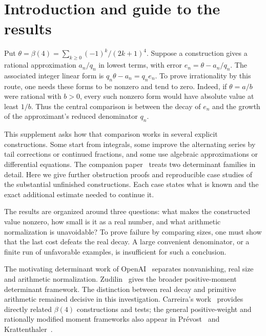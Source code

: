 \section{Introduction and guide to the results}
Put $\theta=\beta(4)=\sum_{k\geq0}(-1)^k/(2k+1)^4$.
Suppose a construction gives a rational approximation $a_n/q_n$ in
lowest terms, with error $e_n=\theta-a_n/q_n$. The associated integer
linear form is $q_n\theta-a_n=q_ne_n$. To prove irrationality by this
route, one needs these forms to be nonzero and tend to zero.
Indeed, if $\theta=a/b$ were rational with $b>0$, every such nonzero form would
have absolute value at least $1/b$. Thus the central comparison is
between the decay of $e_n$ and the growth of the approximant's reduced
denominator $q_n$.

This supplement asks how that comparison works in several explicit
constructions. Some start from integrals, some improve the alternating
series by tail corrections or continued fractions, and some use
algebraic approximations or differential equations. The companion
paper~\cite{Main} treats two determinant families in detail. Here we
give further obstruction proofs and reproducible case studies of the
substantial unfinished constructions. Each case states what is known
and the exact additional estimate needed to continue it.

The results are organized around three questions: what makes the
constructed value nonzero, how small is it as a real number, and what
arithmetic normalization is unavoidable? To prove failure by comparing
sizes, one must show that the last cost defeats the real decay.
A large convenient
denominator, or a finite run of unfavorable examples, is insufficient
for such a conclusion.

The motivating determinant work of OpenAI~\cite[Section~1.2]{OpenAI}
separates nonvanishing, real size and arithmetic normalization.
Zudilin~\cite{Zudilin} gives the broader positive-moment determinant
framework. The distinction between real decay and primitive arithmetic
remained decisive in this investigation. Carreira's work~\cite{Carreira}
provides directly related $\beta(4)$ constructions and tests; the general
positive-weight and rationally modified moment frameworks also appear in
Pr\'evost~\cite{Prevost} and Krattenthaler~\cite{Krattenthaler}.

